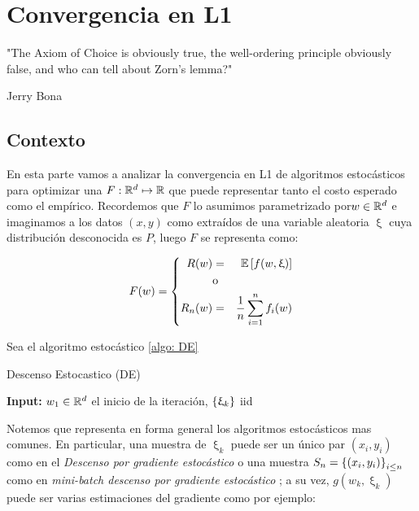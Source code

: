 \chapter{Convergencia en L1}\label{ch:convergenciaL1}

\epigraph{"The Axiom of Choice is obviously true, the well-ordering principle obviously false, and who can tell about Zorn's lemma?"}{Jerry Bona}

\section{Contexto}

En esta parte vamos a analizar la convergencia en L1 de algoritmos estoc\'asticos para optimizar una $F: {\mathbb{R}}^d \mapsto {\mathbb{R}}$ que puede representar tanto el costo esperado como el emp\'irico. Recordemos que $F$ lo asumimos parametrizado por$w \in {\mathbb{R}}^d$ e imaginamos a los datos $(x,y)$ como extra\'idos de una variable aleatoria $\upxi$ cuya distribuci\'on desconocida es $P$, luego $F$ se representa como:

\begin{equation}
F(w) = \left\lbrace
\begin{aligned}
R(w) & = & \mathbb{E} \left[f(w, \upxi)\right] \\
& \text{o} & \\
R_n(w) & = & \frac{1}{n} \sum\limits_{i=1}^{n} {f_i(w)}
\end{aligned}
\right.
\end{equation}

Sea el algoritmo estoc\'astico \ref{algo: DE}

\LinesNumbered
\begin{algorithm}[H]
	\caption{Descenso Estocastico (DE) \label{algo: DE}}
	\textbf{Input:} $w_1 \in {\mathbb{R}}^d$ el inicio de la iteraci\'on, $\left\lbrace\upxi_{k}\right\rbrace $ iid \\
\end{algorithm}

Notemos que representa en forma general los algoritmos estoc\'asticos mas comunes. En particular, una muestra de $\upxi_k$ puede ser un \'unico par $(x_i, y_i)$ como en el \textit{Descenso por gradiente estoc\'astico} o una muestra $S_n = \left\lbrace(x_i, y_i)\right\rbrace_{i \leq n}$ como en \textit{mini-batch descenso por gradiente estoc\'astico} ; a su vez, $g(w_k, \upxi_k)$ puede ser varias estimaciones del gradiente como por ejemplo:

